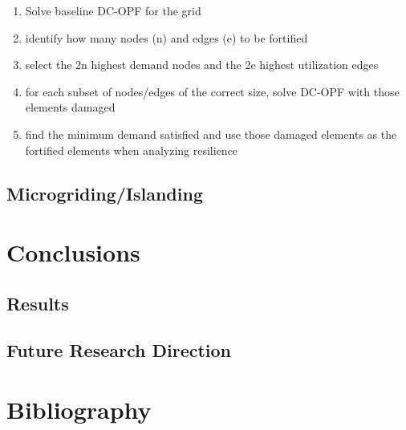 \documentclass{article}
\begin{document}
	\begin{enumerate}
		
	\item Solve baseline DC-OPF for the grid
	\item identify how many nodes (n) and edges (e) to be fortified
	\item select the 2n highest demand nodes and the 2e highest utilization edges
	\item for each subset of nodes/edges of the correct size, solve DC-OPF with those elements damaged
	\item find the minimum demand satisfied and use those damaged elements as the fortified elements when analyzing resilience 
	\end{enumerate}
		
	\subsection{Microgriding/Islanding}
	\section{Conclusions}
	\subsection{Results}
	\subsection{Future Research Direction}
	\section{Bibliography}
	
	
\end{document}
